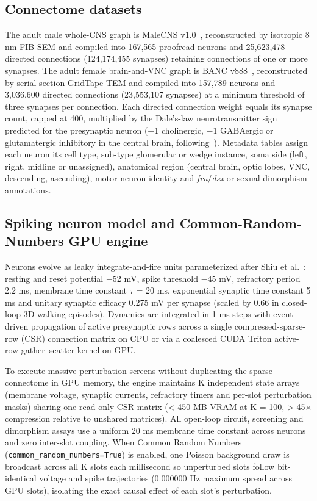 \documentclass[11pt,a4paper]{article}
\begin{document}
\subsection{Connectome datasets}
The adult male whole-CNS graph is MaleCNS v1.0~\cite{berg2026sexual}, reconstructed by isotropic 8 nm FIB-SEM and compiled into 167,565 proofread neurons and 25,623,478 directed connections (124,174,455 synapses) retaining connections of one or more synapses. The adult female brain-and-VNC graph is BANC v888~\cite{bates2025banc}, reconstructed by serial-section GridTape TEM and compiled into 157,789 neurons and 3,036,600 directed connections (23,553,107 synapses) at a minimum threshold of three synapses per connection. Each directed connection weight equals its synapse count, capped at 400, multiplied by the Dale's-law neurotransmitter sign predicted for the presynaptic neuron (+1 cholinergic, $-$1 GABAergic or glutamatergic inhibitory in the central brain, following~\cite{shiu2024drosophila}). Metadata tables assign each neuron its cell type, sub-type glomerular or wedge instance, soma side (left, right, midline or unassigned), anatomical region (central brain, optic lobes, VNC, descending, ascending), motor-neuron identity and \emph{fru}/\emph{dsx} or sexual-dimorphism annotations.

\subsection{Spiking neuron model and Common-Random-Numbers GPU engine}
Neurons evolve as leaky integrate-and-fire units parameterized after Shiu et al.~\cite{shiu2024drosophila}: resting and reset potential $-$52 mV, spike threshold $-$45 mV, refractory period 2.2 ms, membrane time constant $\tau$ = 20 ms, exponential synaptic time constant 5 ms and unitary synaptic efficacy 0.275 mV per synapse (scaled by 0.66 in closed-loop 3D walking episodes). Dynamics are integrated in 1 ms steps with event-driven propagation of active presynaptic rows across a single compressed-sparse-row (CSR) connection matrix on CPU or via a coalesced CUDA Triton active-row gather--scatter kernel on GPU.

To execute massive perturbation screens without duplicating the sparse connectome in GPU memory, the engine maintains K independent state arrays (membrane voltage, synaptic currents, refractory timers and per-slot perturbation masks) sharing one read-only CSR matrix (< 450 MB VRAM at K = 100, > 45$\times$ compression relative to unshared matrices). All open-loop circuit, screening and dimorphism assays use a uniform 20 ms membrane time constant across neurons and zero inter-slot coupling. When Common Random Numbers (\texttt{common\_random\_numbers=True}) is enabled, one Poisson background draw is broadcast across all K slots each millisecond so unperturbed slots follow bit-identical voltage and spike trajectories (0.000000 Hz maximum spread across GPU slots), isolating the exact causal effect of each slot's perturbation.
\end{document}
